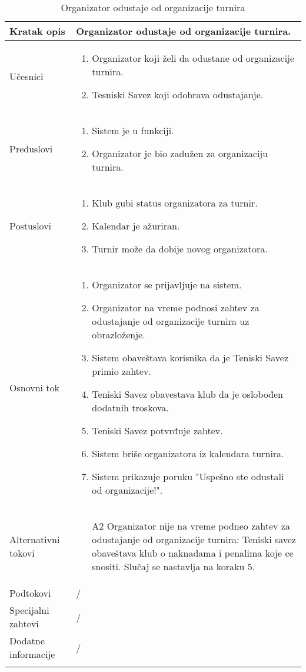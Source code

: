 \documentclass{article}
\begin{document}
\begin{longtable}{| p{} | p{} |} 
\hline
    Kratak opis & Organizator odustaje od organizacije turnira.\\ 
\hline    
    Učesnici & \begin{enumerate}
        \item Organizator koji želi da odustane od organizacije turnira. 
        \item Tesniski Savez koji odobrava odustajanje.
    \end{enumerate}
    \\
\hline
   Preduslovi & \begin{enumerate}
       \item Sistem je u funkciji.
       \item Organizator je bio zadužen za organizaciju turnira.
   \end{enumerate}\\
\hline  
    Postuslovi & \begin{enumerate}
        \item Klub gubi status organizatora za turnir.
        \item Kalendar je ažuriran.
        \item Turnir može da dobije novog organizatora.
    \end{enumerate}\\
\hline
    Osnovni tok & \begin{enumerate}
        \item Organizator se prijavljuje na sistem.
        \item Organizator na vreme podnosi zahtev za odustajanje od organizacije turnira uz obrazloženje.
        \item Sistem obaveštava korisnika da je Teniski Savez primio zahtev.
        \item Teniski Savez obavestava klub da je oslobođen dodatnih troskova.
        \item Teniski Savez potvrđuje zahtev.
        \item Sistem briše organizatora iz kalendara turnira.
        \item Sistem prikazuje poruku "Uspešno ste odustali od organizacije!".

    \end{enumerate}\\
\hline
    Alternativni tokovi & \begin{enumerate}
            \item[A2] Organizator nije na vreme podneo zahtev za odustajanje od organizacije turnira: Teniski savez obaveštava klub o naknadama i penalima koje ce snositi. Slučaj se nastavlja na koraku 5.
        \end{enumerate}\\
\hline
    Podtokovi & /\\
\hline
    Specijalni zahtevi & /\\
\hline
    Dodatne informacije & / \\
\hline

\caption{Organizator odustaje od organizacije turnira}
\end{longtable}
\end{document}
